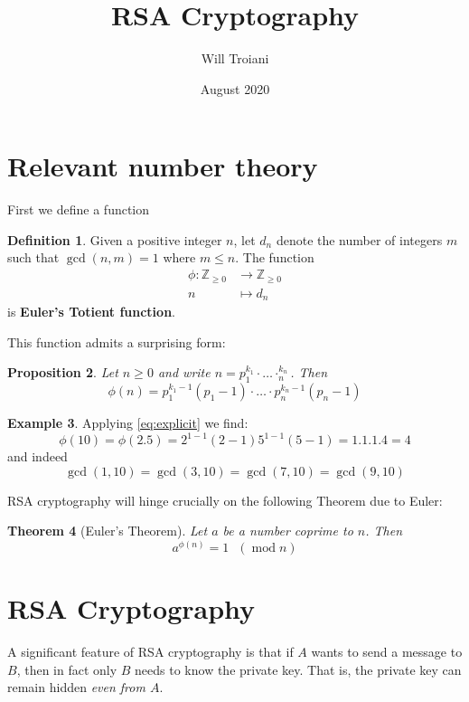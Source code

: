 \documentclass[12pt]{article}
\title{RSA Cryptography}
\author{Will Troiani}
\date{August 2020}
\theoremstyle{plain}
\newtheorem{thm}{Theorem}[subsection] %
\newtheorem{proposition}[thm]{Proposition}
\theoremstyle{definition}
\newtheorem{defn}[thm]{Definition} %
\newtheorem{example}[thm]{Example}
\newcommand{\bb}[1]{\mathbb{#1}}
\newcommand{\lto}{\longrightarrow}
\begin{document}
\maketitle
\tableofcontents

\section{Relevant number theory}
First we define a function
\begin{defn}
Given a positive integer $n$, let $d_n$ denote the number of integers $m$ such that $\operatorname{gcd}(n,m) = 1$ where $m \leq n$. The function
\begin{align*}
\phi: \bb{Z}_{\geq 0} &\lto \bb{Z}_{\geq 0}\\
n &\longmapsto d_n
\end{align*}
is \textbf{Euler's Totient function}.
\end{defn}
This function admits a surprising form:
\begin{proposition}
Let $n \geq 0$ and write $n = p_1^{k_1}\cdot\hdots\cdotp_n^{k_n}$. Then
\begin{equation}\label{eq:explicit}
\phi(n) = p_1^{k_1 - 1}(p_1 - 1)\cdot\hdots\cdot p_n^{k_n-1}(p_n-1)
\end{equation}
\end{proposition}
\begin{example}
Applying \eqref{eq:explicit} we find:
\begin{equation}
\phi(10) = \phi(2.5) = 2^{1-1}(2-1)5^{1-1}(5-1) = 1.1.1.4 = 4
\end{equation}
and indeed
\begin{equation}
\operatorname{gcd}(1,10) = \operatorname{gcd}(3,10) = \operatorname{gcd}(7,10) = \operatorname{gcd}(9,10)
\end{equation}
\end{example}
RSA cryptography will hinge crucially on the following Theorem due to Euler:
\begin{thm}[Euler's Theorem]\label{thm:euler}
Let $a$ be a number coprime to $n$. Then
\begin{equation}
a^{\phi(n)} = 1\text{ }(\operatorname{mod}n)
\end{equation}
\end{thm}
\section{RSA Cryptography}
A significant feature of RSA cryptography is that if $A$ wants to send a message to $B$, then in fact only $B$ needs to know the private key. That is, the private key can remain hidden \emph{even from $A$}.
\end{document}
